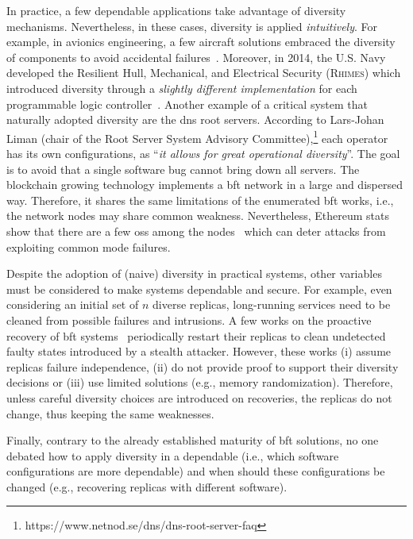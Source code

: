 In practice, a few dependable applications take advantage of diversity mechanisms. 
Nevertheless, in these cases, diversity is applied \emph{intuitively}.
For example, in avionics engineering, a few aircraft solutions embraced the diversity of components to avoid accidental failures~\cite{Yeh:2004}.
Moreover, in 2014, the U.S. Navy developed the Resilient Hull, Mechanical, and Electrical Security (\textsc{Rhimes}) which introduced diversity through a \emph{slightly different implementation} for each programmable logic controller~\cite{rhimes}.
Another example of a critical system that naturally adopted diversity are the \gls{dns} root servers. 
According to Lars-Johan Liman (chair of the Root Server System Advisory Committee),\footnote{https://www.netnod.se/dns/dns-root-server-faq} each operator has its own configurations, as ``\emph{it allows for great operational diversity}''. The goal is to avoid that a single software bug cannot bring down all servers.
The blockchain growing technology implements a \gls{bft} network in a large and dispersed way.
Therefore, it shares the same limitations of the enumerated \gls{bft} works, i.e., the network nodes may share common weakness.
Nevertheless, Ethereum stats show that there are a few \glspl{os} among the nodes~\cite{Ethstats,Ethernodes} which can deter attacks from exploiting common mode failures.


Despite the adoption of (naive) diversity in practical systems, other variables must be considered to make systems dependable and secure.
For example, even considering an initial set of $n$ diverse replicas, long-running services need to be cleaned from possible failures and intrusions.
A few works on the proactive recovery of \gls{bft} systems~\cite{Castro:2002,Sousa:2010,Roeder:2010,Platania:2014,Distler:2011} periodically restart their replicas to clean undetected faulty states introduced by a stealth attacker. 
However, these works (i) assume replicas failure independence, (ii) do not provide proof to support their diversity decisions or (iii) use limited solutions (e.g., memory randomization).
Therefore, unless careful diversity choices are introduced on recoveries, the replicas do not change, thus keeping the same weaknesses.


Finally, contrary to the already established maturity of \gls{bft} solutions, no one debated how to apply diversity in a dependable (i.e., which software configurations are more dependable) and when should these configurations be changed (e.g., recovering replicas with different software).

